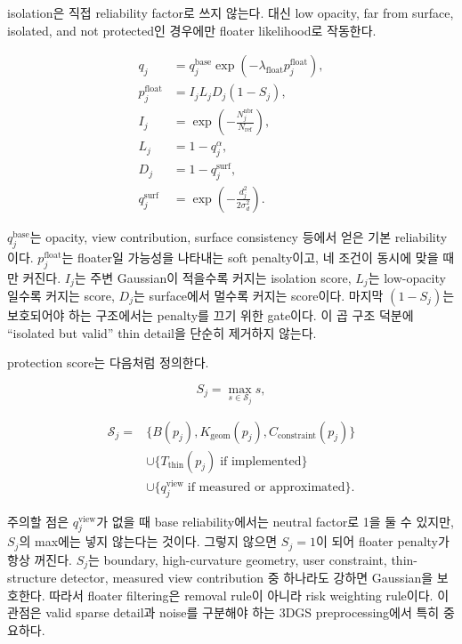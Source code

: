 \documentclass[11pt,a4paper]{article}
\begin{document}
isolation은 직접 reliability factor로 쓰지 않는다. 대신 low opacity, far from surface, isolated, and not protected인 경우에만 floater likelihood로 작동한다.

\begin{align}
q_j &= q_j^{\mathrm{base}}\exp(-\lambda_{\mathrm{float}}p_j^{\mathrm{float}}),\\
p_j^{\mathrm{float}} &= I_jL_jD_j(1-S_j),\\
I_j &= \exp\left(-\frac{N_j^{\mathrm{nbr}}}{N_{\mathrm{ref}}}\right),\\
L_j &= 1-q_j^\alpha,\\
D_j &= 1-q_j^{\mathrm{surf}},\\
q_j^{\mathrm{surf}} &= \exp\left(-\frac{d_j^2}{2\sigma_d^2}\right).
\end{align}

$q_j^{\mathrm{base}}$는 opacity, view contribution, surface consistency 등에서 얻은 기본 reliability이다.
$p_j^{\mathrm{float}}$는 floater일 가능성을 나타내는 soft penalty이고, 네 조건이 동시에 맞을 때만 커진다.
$I_j$는 주변 Gaussian이 적을수록 커지는 isolation score, $L_j$는 low-opacity일수록 커지는 score, $D_j$는 surface에서 멀수록 커지는 score이다.
마지막 $(1-S_j)$는 보호되어야 하는 구조에서는 penalty를 끄기 위한 gate이다.
이 곱 구조 덕분에 ``isolated but valid'' thin detail을 단순히 제거하지 않는다.

protection score는 다음처럼 정의한다.

\begin{equation}
S_j=\max_{s\in\mathcal{S}_j}s,
\end{equation}

\begin{equation}
\begin{aligned}
\mathcal{S}_j={}&
\{B(p_j),K_{\mathrm{geom}}(p_j),C_{\mathrm{constraint}}(p_j)\}\\
&\cup\{T_{\mathrm{thin}}(p_j)\;\text{if implemented}\}\\
&\cup\{q_j^{\mathrm{view}}\;\text{if measured or approximated}\}.
\end{aligned}
\end{equation}

주의할 점은 $q_j^{\mathrm{view}}$가 없을 때 base reliability에서는 neutral factor로 1을 둘 수 있지만, $S_j$의 max에는 넣지 않는다는 것이다. 그렇지 않으면 $S_j=1$이 되어 floater penalty가 항상 꺼진다.
$S_j$는 boundary, high-curvature geometry, user constraint, thin-structure detector, measured view contribution 중 하나라도 강하면 Gaussian을 보호한다.
따라서 floater filtering은 removal rule이 아니라 risk weighting rule이다.
이 관점은 valid sparse detail과 noise를 구분해야 하는 3DGS preprocessing에서 특히 중요하다.
\end{document}
